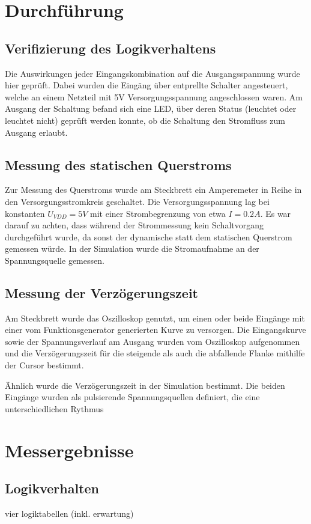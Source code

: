 \documentclass[11pt, a4paper]{article}
\begin{document}
\section*{Durchführung}
\subsection*{Verifizierung des Logikverhaltens}
Die Auswirkungen jeder Eingangskombination auf die Ausgangsspannung wurde hier geprüft. Dabei wurden die Eingäng über entprellte Schalter angesteuert, welche an einem Netzteil mit 5V Versorgungsspannung angeschlossen waren. Am Ausgang der Schaltung befand sich eine LED, über deren Status (leuchtet oder leuchtet nicht) geprüft werden konnte, ob die Schaltung den Stromfluss zum Ausgang erlaubt. 
\subsection*{Messung des statischen Querstroms}
Zur Messung des Querstroms wurde am Steckbrett ein Amperemeter in Reihe in den Versorgungsstromkreis geschaltet.
Die Versorgungsspannung lag bei konstanten $U_{VDD} = 5V$ mit einer Strombegrenzung von etwa $I = 0.2A$. Es war darauf zu achten, dass während der Strommessung kein Schaltvorgang durchgeführt wurde, da sonst der dynamische statt dem statischen Querstrom gemessen würde.
In der Simulation wurde die Stromaufnahme an der Spannungsquelle gemessen. 
\subsection*{Messung der Verzögerungszeit}
Am Steckbrett wurde das Oszilloskop genutzt, um einen oder beide Eingänge mit einer vom Funktionsgenerator generierten Kurve zu versorgen. Die Eingangskurve sowie der Spannungsverlauf am Ausgang wurden vom Oszilloskop aufgenommen und die Verzögerungszeit für die steigende als auch die abfallende Flanke mithilfe der Cursor bestimmt.

Ähnlich wurde die Verzögerungszeit in der Simulation bestimmt. Die beiden Eingänge wurden als pulsierende Spannungsquellen definiert, die eine unterschiedlichen Rythmus
\section*{Messergebnisse}
\subsection*{Logikverhalten}
vier logiktabellen (inkl. erwartung)
\end{document}
